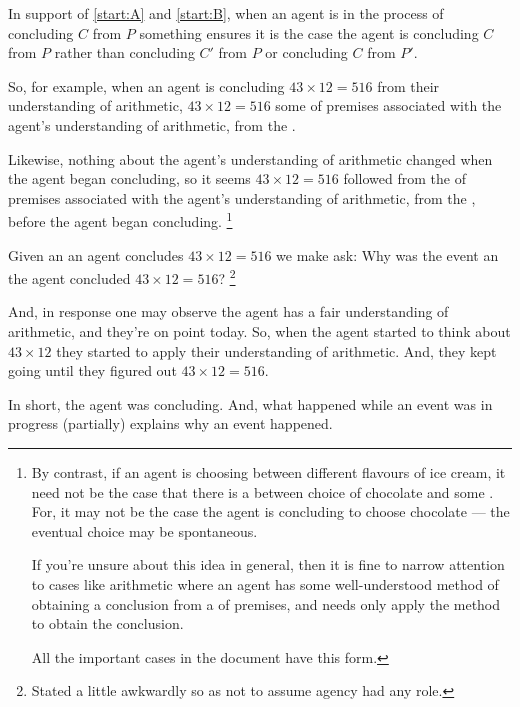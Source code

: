 \begin{note}
  In support of \ref{start:A} and \ref{start:B}, when an agent is in the process of concluding \(C\) from \(P\) something ensures it is the case the agent is concluding \(C\) from \(P\) rather than concluding \(C'\) from \(P\) or concluding \(C\) from \(P'\).

  So, for example, when an agent is concluding \(43 \times 12 = 516\) from their understanding of arithmetic, \(43 \times 12 = 516\) \fof{} some \pool{} of premises associated with the agent's understanding of arithmetic, from the \agpe{}.

  Likewise, nothing about the agent's understanding of arithmetic changed when the agent began concluding, so it seems \(43 \times 12  = 516\) followed from the \pool{} of premises associated with the agent's understanding of arithmetic, from the \agpe{}, before the agent began concluding.%
  \footnote{
    By contrast, if an agent is choosing between different flavours of ice cream, it need not be the case that there is a \fingfr{} between choice of chocolate and some \pool{}.
    For, it may not be the case the agent is concluding to choose chocolate  --- the eventual choice may be spontaneous.

    If you're unsure about this idea in general, then it is fine to narrow attention to cases like arithmetic where an agent has some well-understood method of obtaining a conclusion from a \pool{} of premises, and needs only apply the method to obtain the conclusion.

    All the important cases in the document have this form.
  }
\end{note}


\begin{note}
  Given an \eiw{} an agent concludes \(43 \times 12 = 516\) we make ask:
  Why was the event an \eiw{} the agent concluded \(43 \times 12 = 516\)?%
  \footnote{
    Stated a little awkwardly so as not to assume agency had any role.
  }

  And, in response one may observe the agent has a fair understanding of arithmetic, and they're on point today.
  So, when the agent started to think about \(43 \times 12\) they started to apply their understanding of arithmetic.
  And, they kept going until they figured out \(43 \times 12 = 516\).

  In short, the agent was concluding.
  And, what happened while an event was in progress (partially) explains why an event happened.
\end{note}



